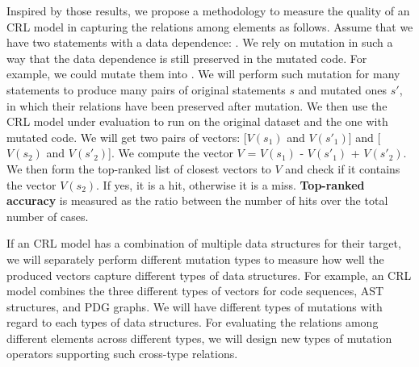 Inspired by those results, we propose a methodology to measure the
quality of an CRL model in capturing the relations among elements as
follows. Assume that we have two statements with a data dependence:
.  We rely on mutation in such a way that
the data dependence is still preserved in the mutated code. For
example, we could mutate them into . We
will perform such mutation for many statements to produce many pairs
of original statements $s$ and mutated ones $s'$, in which their
relations have been preserved after mutation.  We then use the CRL
model under evaluation to run on the original dataset and the one with
mutated code. We will get two pairs of vectors: [$V(s_1)$ and
  $V(s'_1)$] and [$V(s_2)$ and $V(s'_2)$]. We compute the vector $V$ =
$V(s_1)$ - $V(s'_1)$ + $V(s'_2)$.  We then form the top-ranked list of
closest vectors to $V$ and check if it contains the vector
$V(s_2)$. If yes, it is a hit, otherwise it is a miss. {\bf
  Top-ranked accuracy} is measured as the ratio between the number of
hits over the total number of cases.

If an CRL model has a combination of multiple data structures for
their target, we will separately perform different mutation types to
measure how well the produced vectors capture different types of data
structures. For example, an CRL model combines the three different
types of vectors for code sequences, AST structures, and PDG graphs.
We will have different types of mutations with regard to each types of
data structures. For evaluating the relations among different elements
across different types, we will design new types of mutation operators
supporting such cross-type relations.

